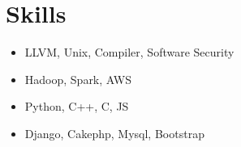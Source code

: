 \documentclass[a4paper,10pt]{article}
\begin{document}
\section{Skills}
\begin{itemize}
\item LLVM, Unix, Compiler, Software Security
\item Hadoop, Spark, AWS
\item Python, C++, C, JS
\item Django, Cakephp, Mysql, Bootstrap
\end{itemize}



\end{document}
